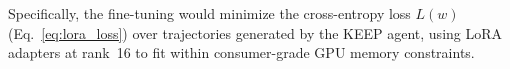 
Specifically, the fine-tuning would minimize
the cross-entropy loss $L(w)$ (Eq.~\ref{eq:lora_loss})
over trajectories generated by the KEEP agent,
using LoRA adapters at rank~16 to fit within consumer-grade
GPU memory constraints.


%
%
%
